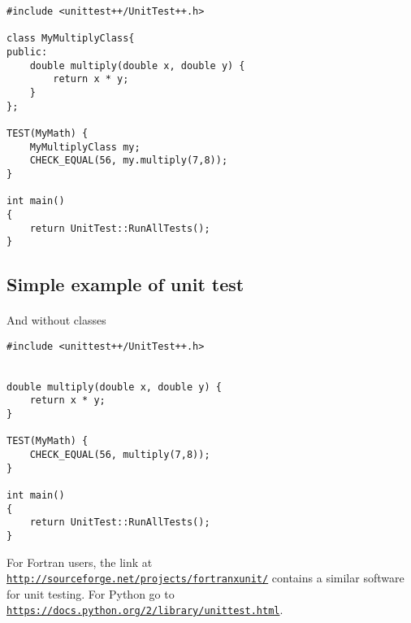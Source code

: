 \begin{verbatim}
#include <unittest++/UnitTest++.h>

class MyMultiplyClass{
public:
    double multiply(double x, double y) {
        return x * y;
    }
};

TEST(MyMath) {
    MyMultiplyClass my;
    CHECK_EQUAL(56, my.multiply(7,8));
}

int main()
{
    return UnitTest::RunAllTests();
}

\end{verbatim}



\subsection*{Simple example of unit test}

\paragraph{}
And without classes
















\begin{verbatim}
#include <unittest++/UnitTest++.h>


double multiply(double x, double y) {
    return x * y;
}

TEST(MyMath) {
    CHECK_EQUAL(56, multiply(7,8));
}

int main()
{
    return UnitTest::RunAllTests();
} 

\end{verbatim}

For Fortran users, the link at \href{{http://sourceforge.net/projects/fortranxunit/}}{\nolinkurl{http://sourceforge.net/projects/fortranxunit/}} contains a similar
software for unit testing. For Python go to \href{{https://docs.python.org/2/library/unittest.html}}{\nolinkurl{https://docs.python.org/2/library/unittest.html}}.



